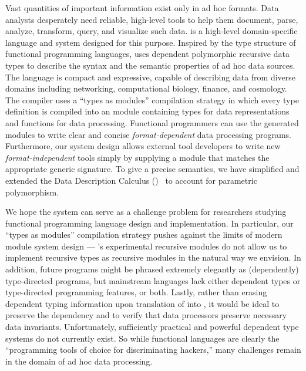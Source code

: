 Vast quantities of important information exist only in ad hoc formats.  
Data analysts desperately need reliable, high-level tools to 
help them document, parse, analyze, transform, query, and visualize such data.  
\padsml{} is a high-level domain-specific language and system
designed for this purpose.  
Inspired by the type structure of functional
programming languages, \padsml{} uses dependent
polymorphic recursive data types to describe the syntax and the semantic properties of ad hoc data sources.  The language is compact and expressive, capable of describing data from diverse domains including networking, computational biology, finance, and cosmology. 
The \padsml{} compiler uses a ``types as modules'' compilation strategy
in which every \padsml{} type definition is compiled into
an \ocaml{} module containing types for data representations
and functions for data processing.  Functional programmers
can use the generated modules to write clear and concise {\em format-dependent}
data processing programs.  Furthermore, our system design
allows external tool developers to write new {\em format-independent} tools
simply by supplying a module that matches the appropriate generic
signature.  
To give \padsml{} a precise semantics, we have simplified and extended the Data Description Calculus (\ddc)~\cite{fisher+:next700ddl} to account for parametric polymorphism.


We hope the \padsml{} system can serve as a 
challenge problem for researchers studying functional programming language
design and implementation.  In particular, our ``types as modules'' 
compilation strategy pushes against
the limits of modern module system design --- \ocaml{}'s experimental
recursive modules do not allow us to implement recursive types as
recursive modules in the natural way we envision.  
In addition, future \padsml{} programs
might be phrased extremely elegantly
as (dependently) type-directed programs, but mainstream
languages lack either dependent types or type-directed programming
features, or  both.  Lastly, rather than erasing
dependent typing information upon translation of \padsml{} into \ocaml{},
it would be ideal to preserve the dependency and to verify
that data processors preserve necessary data invariants.
Unfortunately,
sufficiently practical and powerful dependent type systems 
do not currently exist.  So while functional languages are clearly the
``programming tools of choice for discriminating hackers,''
many challenges remain in the domain of ad hoc data processing.


